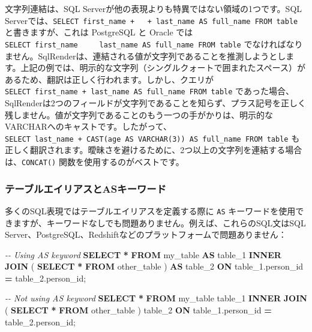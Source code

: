 \documentclass[
  11pt]{book}
\newenvironment{Shaded}{\begin{snugshade}}{\end{snugshade}}
\newcommand{\CommentTok}[1]{\textcolor[rgb]{0.56,0.35,0.01}{\textit{#1}}}
\newcommand{\KeywordTok}[1]{\textcolor[rgb]{0.13,0.29,0.53}{\textbf{#1}}}
\newcommand{\NormalTok}[1]{#1}
\newcommand{\OperatorTok}[1]{\textcolor[rgb]{0.81,0.36,0.00}{\textbf{#1}}}
\theoremstyle{definition}
\theoremstyle{definition}
\theoremstyle{definition}
\theoremstyle{definition}
\theoremstyle{remark}
\begin{document}
文字列連結は、SQL Serverが他の表現よりも特異ではない領域の1つです。SQL Serverでは、\texttt{SELECT\ first\_name\ +\ \textquotesingle{}\ \textquotesingle{}\ +\ last\_name\ AS\ full\_name\ FROM\ table} と書きますが、これは PostgreSQL と Oracle では \texttt{SELECT\ first\_name\ \textbar{}\textbar{}\ \textquotesingle{}\ \textquotesingle{}\ \textbar{}\textbar{}\ last\_name\ AS\ full\_name\ FROM\ table} でなければなりません。SqlRenderは、連結される値が文字列であることを推測しようとします。上記の例では、明示的な文字列（シングルクォートで囲まれたスペース）があるため、翻訳は正しく行われます。しかし、クエリが \texttt{SELECT\ first\_name\ +\ last\_name\ AS\ full\_name\ FROM\ table} であった場合、SqlRenderは2つのフィールドが文字列であることを知らず、プラス記号を正しく残しません。値が文字列であることのもう一つの手がかりは、明示的なVARCHARへのキャストです。したがって、\texttt{SELECT\ last\_name\ +\ CAST(age\ AS\ VARCHAR(3))\ AS\ full\_name\ FROM\ table} も正しく翻訳されます。曖昧さを避けるために、2つ以上の文字列を連結する場合は、\texttt{CONCAT()} 関数を使用するのがベストです。

\subsubsection*{テーブルエイリアスとASキーワード}\label{ux30c6ux30fcux30d6ux30ebux30a8ux30a4ux30eaux30a2ux30b9ux3068asux30adux30fcux30efux30fcux30c9}

多くのSQL表現ではテーブルエイリアスを定義する際に \texttt{AS} キーワードを使用できますが、キーワードなしでも問題ありません。例えば、これらのSQL文はSQL Server、PostgreSQL、Redshiftなどのプラットフォームで問題ありません：

\begin{Shaded}
\begin{Highlighting}[]
\CommentTok{{-}{-} Using AS keyword}
\KeywordTok{SELECT} \OperatorTok{*}
\KeywordTok{FROM}\NormalTok{ my\_table }\KeywordTok{AS}\NormalTok{ table\_1}
\KeywordTok{INNER} \KeywordTok{JOIN}\NormalTok{ (}
  \KeywordTok{SELECT} \OperatorTok{*} \KeywordTok{FROM}\NormalTok{ other\_table}
\NormalTok{) }\KeywordTok{AS}\NormalTok{ table\_2}
\KeywordTok{ON}\NormalTok{ table\_1.person\_id }\OperatorTok{=}\NormalTok{ table\_2.person\_id;}

\CommentTok{{-}{-} Not using AS keyword}
\KeywordTok{SELECT} \OperatorTok{*}
\KeywordTok{FROM}\NormalTok{ my\_table table\_1}
\KeywordTok{INNER} \KeywordTok{JOIN}\NormalTok{ (}
  \KeywordTok{SELECT} \OperatorTok{*} \KeywordTok{FROM}\NormalTok{ other\_table}
\NormalTok{) table\_2}
\KeywordTok{ON}\NormalTok{ table\_1.person\_id }\OperatorTok{=}\NormalTok{ table\_2.person\_id;}
\end{Highlighting}
\end{Shaded}
\end{document}

